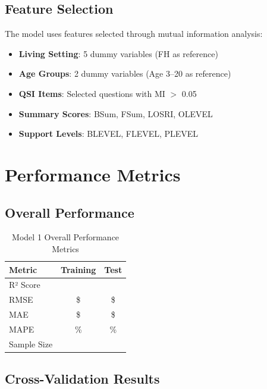 \subsection{Feature Selection}

The model uses \ModelOneNumFeatures{} features selected through mutual information analysis:
\begin{itemize}
    \item \textbf{Living Setting}: 5 dummy variables (FH as reference)
    \item \textbf{Age Groups}: 2 dummy variables (Age 3--20 as reference)
    \item \textbf{QSI Items}: Selected questions with MI $>$ 0.05
    \item \textbf{Summary Scores}: BSum, FSum, LOSRI, OLEVEL
    \item \textbf{Support Levels}: BLEVEL, FLEVEL, PLEVEL
\end{itemize}

\section{Performance Metrics}

\subsection{Overall Performance}

\begin{table}[h]
\centering
\caption{Model 1 Overall Performance Metrics}
\begin{tabular}{lcc}
\toprule
\textbf{Metric} & \textbf{Training} & \textbf{Test} \\
\midrule
R² Score & \ModelOneRSquaredTrain{} & \ModelOneRSquaredTest{} \\
RMSE & \$\ModelOneRMSETrain{} & \$\ModelOneRMSETest{} \\
MAE & \$\ModelOneMAETrain{} & \$\ModelOneMAETest{} \\
MAPE & \ModelOneMAPETrain{}\% & \ModelOneMAPETest{}\% \\
Sample Size & \ModelOneTrainingSamples{} & \ModelOneTestSamples{} \\
\bottomrule
\end{tabular}
\end{table}

\subsection{Cross-Validation Results}

